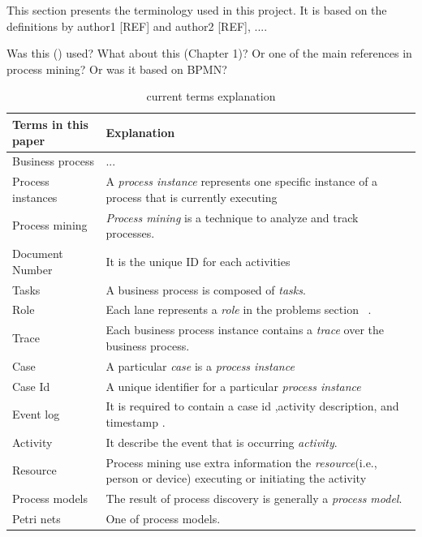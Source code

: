 This section presents the terminology used in this project.
It is based on the definitions by author1 [REF] and author2 [REF], .... 

Was this (\cite{Aalst2013}) used? What about this \cite{dumasFundamentalsBusinessProcess2018} (Chapter 1)? Or one of the main references in process mining? Or was it based on BPMN?

\begin{table}[htb]
\footnotesize	 %
\begin{tabularx}{\textwidth}{X X}

\hline
Terms in this paper   & Explanation \\
\hline 
Business process & ... \\
\hline
Process instances & A \textit{process instance} represents one specific instance of a process that is currently executing \\
\hline
Process mining & \textit{Process mining} is a technique to analyze and track processes.\\
\hline
Document Number & It is the unique ID for each activities  \\
\hline
Tasks & A business process is composed of \textit{tasks}. \\
\hline
Role & Each lane represents a \textit{role} in the problems section~\pageref{figure:soAndfieldservice}  . \\
\hline
Trace & Each business process instance contains a \textit{trace} over the business process. \\
\hline
Case &  A particular \textit{case} is a \textit{process instance} \\ 
\hline
Case Id & A unique identifier for a particular \textit{process instance}\\
\hline
Event log & It is required to contain a case id ,activity description, and timestamp . \\
\hline
Activity & It describe the event that is occurring \textit{activity}. \\
\hline
Resource & Process mining use extra information the \textit{resource}(i.e., person or device) executing or initiating the activity \\
\hline
Process models & The result of process discovery is generally a \textit{process model}. \\
\hline
Petri nets & One of process models. \\
\hline

\end{tabularx}
\caption{current terms explanation}
\label{table:terminology}
\end{table}


